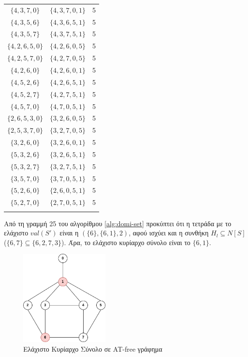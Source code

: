 \begin{longtable}{|c|c|c|}
	$\{4,3,7,0\}$ & $\{4,3,7,0,1\}$ & 5 \\
	$\{4,3,5,6\}$ & $\{4,3,6,5,1\}$ & 5 \\
	$\{4,3,5,7\}$ & $\{4,3,7,5,1\}$ & 5 \\
	$\{4,2,6,5,0\}$ & $\{4,2,6,0,5\}$ & 5 \\
	$\{4,2,5,7,0\}$ & $\{4,2,7,0,5\}$ & 5 \\
	$\{4,2,6,0\}$ & $\{4,2,6,0,1\}$ & 5 \\
	$\{4,5,2,6\}$ & $\{4,2,6,5,1\}$ & 5 \\
	$\{4,5,2,7\}$ & $\{4,2,7,5,1\}$ & 5 \\
	$\{4,5,7,0\}$ & $\{4,7,0,5,1\}$ & 5 \\
	$\{2,6,5,3,0\}$ & $\{3,2,6,0,5\}$ & 5 \\
	$\{2,5,3,7,0\}$ & $\{3,2,7,0,5\}$ & 5 \\
	$\{3,2,6,0\}$ & $\{3,2,6,0,1\}$ & 5 \\
	$\{5,3,2,6\}$ & $\{3,2,6,5,1\}$ & 5 \\
	$\{5,3,2,7\}$ & $\{3,2,7,5,1\}$ & 5 \\
	$\{3,5,7,0\}$ & $\{3,7,0,5,1\}$ & 5 \\
	$\{5,2,6,0\}$ & $\{2,6,0,5,1\}$ & 5 \\
	$\{5,2,7,0\}$ & $\{2,7,0,5,1\}$ & 5 \\
	\hline
	\label{tab:Al-domi}
\end{longtable}


Από τη γραμμή 25 του αλγορίθμου \ref{alg:domi-set} προκύπτει ότι η τετράδα με το ελάχιστο $val(S')$ είναι η $(\{6\}, \{6, 1\}, 2)$, αφού ισχύει και η συνθήκη $H_l \subseteq N[S]$ ($\{6,7\} \subseteq \{6,2,7,3\}$). Άρα, το ελάχιστο κυρίαρχο σύνολο είναι το $\{6, 1\}$.

\begin{figure}[H]
	\centering
	\includegraphics[width=0.4\textwidth]{pictures/at-free-graph-domi-set.png} 
	\caption{Ελάχιστο Κυρίαρχο Σύνολο σε AT-free γράφημα}
	\label{fig:at-free-graph-domi-set}
\end{figure}

